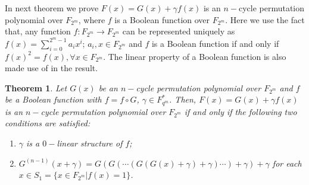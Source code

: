 \documentclass[12pt,a4paper]{article}
\newtheorem{theorem}{Theorem}[section]
\begin{document}
In next theorem we prove $F(x)=G(x)+\gamma f(x)  $ is an $ n-$cycle permutation polynomial over $ F_{2^{m}} $, where $ f $ is a Boolean function over $ F_{2^{m}} $. Here we use the fact that,
any function $ f:F_{2^{m}}\rightarrow F_{2^{m}}  $ can be   represented uniquely as $ f(x)=\sum\limits_{i=0}^{2^{m}-1}a_{i}x^{i}$; $ a_{i},x\in F_{2^{m}} $ and $ f $ is a Boolean function if and only if $ f(x)^{2}=f(x) ,\forall x\in F_{2^{m}}$. The linear property of a Boolean function is also made use of in the result. 
\begin{theorem}\label{t4}
	Let $ G(x) $ be an $ n-$cycle permutation polynomial over $ F_{2^{m}} $ and $ f $ be a Boolean function with $ f=f\circ G $, $\gamma\in F_{q^{m}}^{*}$. Then, $ F(x)=G(x)+\gamma f(x) $ is an $ n-$cycle permutation polynomial over $ F_{2^{m}} $ if and only if the following two conditions are satisfied:
	\begin{enumerate}
		\item $\gamma$ is a $ 0-$linear structure of $ f $;
		\item $ G^{(n-1)}(x+\gamma)=G(G(\cdots(G(G(x)+\gamma )+\gamma )\cdots)+\gamma )+\gamma  $ for each \\$x\in S_{1}=\{x\in F_{2^{m}}|f(x)=1\}$.
	\end{enumerate}
\end{theorem}
\end{document}

